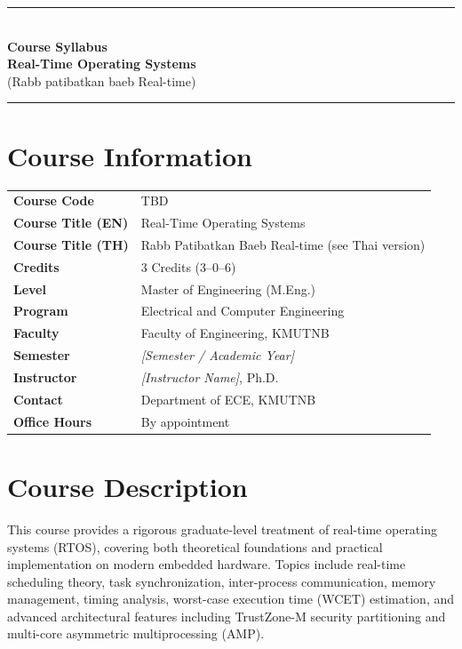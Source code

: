 \documentclass[12pt, a4paper]{article}
\begin{document}
\begin{center}
  {\color{kmutnbBlue}\rule{\linewidth}{2pt}}\\[6pt]
  {\LARGE\bfseries\color{kmutnbBlue} Course Syllabus}\\[4pt]
  {\large\bfseries Real-Time Operating Systems}\\[2pt]
  {\normalsize (Rabb patibatkan baeb Real-time)}\\[8pt]
  {\color{kmutnbGold}\rule{\linewidth}{1pt}}
\end{center}

\vspace{0.5cm}

\section*{Course Information}

\begin{tabular}{@{}p{4.5cm} p{9cm}@{}}
  \textbf{Course Code}       & TBD \\[2pt]
  \textbf{Course Title (EN)} & Real-Time Operating Systems \\[2pt]
  \textbf{Course Title (TH)} & Rabb Patibatkan Baeb Real-time (see Thai version) \\[2pt]
  \textbf{Credits}           & 3 Credits (3--0--6) \\[2pt]
  \textbf{Level}             & Master of Engineering (M.Eng.) \\[2pt]
  \textbf{Program}           & Electrical and Computer Engineering \\[2pt]
  \textbf{Faculty}           & Faculty of Engineering, KMUTNB \\[2pt]
  \textbf{Semester}          & \textit{[Semester / Academic Year]} \\[2pt]
  \textbf{Instructor}        & \textit{[Instructor Name]}, Ph.D. \\[2pt]
  \textbf{Contact}           & Department of ECE, KMUTNB \\[2pt]
  \textbf{Office Hours}      & By appointment \\
\end{tabular}

\section{Course Description}

This course provides a rigorous graduate-level treatment of real-time operating systems
(RTOS), covering both theoretical foundations and practical implementation on modern
embedded hardware. Topics include real-time scheduling theory, task synchronization,
inter-process communication, memory management, timing analysis, worst-case execution
time (WCET) estimation, and advanced architectural features including TrustZone-M
security partitioning and multi-core asymmetric multiprocessing (AMP).
\end{document}
